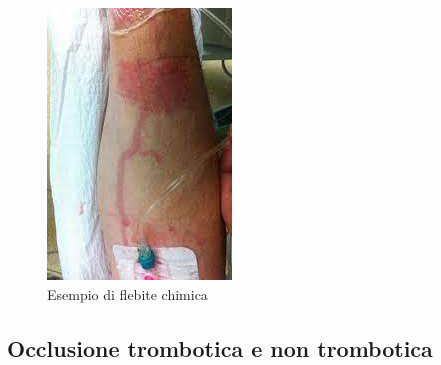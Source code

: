 \begin{figure}[H]
    \begin{center}
    \includegraphics[width=0.3\columnwidth]{img/flebite.jpeg}
    \end{center}
    \caption[Esempio di flebite chimica]{Esempio di flebite chimica
    \cite{img53}}

\end{figure}

\subsection{Occlusione trombotica e non trombotica}


